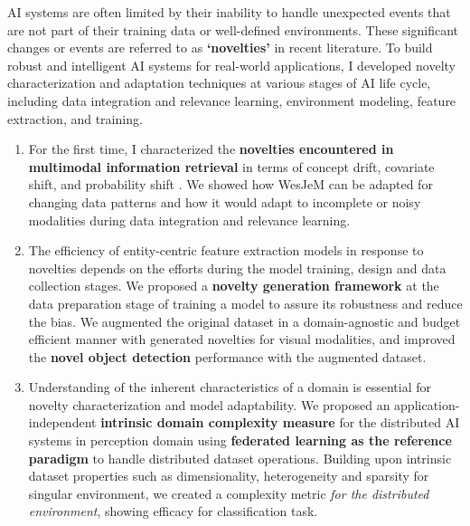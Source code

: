 
AI systems are often limited by their inability to handle unexpected events that are not part of their training data or well-defined environments. These significant changes or events are referred to as \textbf{`novelties'} in recent literature. %
To build robust and intelligent AI systems for real-world applications, I developed novelty characterization and adaptation techniques at various stages of AI life cycle, including data integration and relevance learning, environment modeling, feature extraction, and training. %

\begin{enumerate}%
    \item For the first time, I characterized the \textbf{novelties encountered in multimodal information retrieval} in terms of concept drift, covariate shift, and probability shift \cite{solaiman2022open}. We showed how WesJeM can be adapted for changing data patterns and how it would adapt to incomplete or noisy modalities during data integration and relevance learning.
    \item %
    The efficiency of entity-centric feature extraction %
    models in response to novelties depends on the efforts during the model training, design and data collection stages. We proposed a \textbf{novelty generation framework} \cite{nesen2021dataset} at
    the data preparation stage of training a model to assure its robustness and reduce the bias. We augmented the original dataset in a domain-agnostic
    and budget efficient manner with generated novelties for visual modalities, %
    and improved the \textbf{novel object detection} performance with the augmented dataset.
    \item %
    Understanding of the inherent characteristics of a domain is essential for novelty characterization and model adaptability. %
    We proposed an application-independent \textbf{intrinsic domain complexity measure} for the distributed AI systems in perception domain \cite{solaiman2023domainComplexity} using \textbf{federated learning as the reference paradigm} to handle distributed dataset operations.
    Building upon intrinsic dataset properties such as dimensionality, heterogeneity and sparsity for singular environment, we created a complexity metric \textit{for the distributed environment}, showing efficacy for classification task. 
\end{enumerate}

